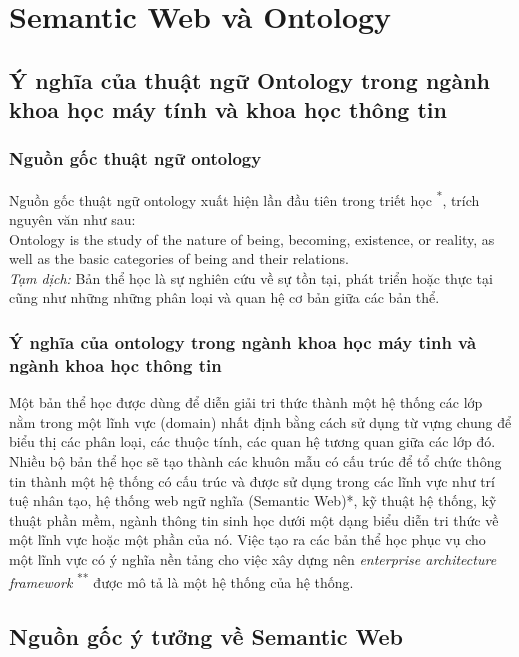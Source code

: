\chapter{Semantic Web và Ontology}
\section{Ý nghĩa của thuật ngữ Ontology trong ngành khoa học máy tính và khoa học thông tin}
\subsection{Nguồn gốc thuật ngữ ontology}
Nguồn gốc thuật ngữ ontology xuất hiện lần đầu tiên trong triết học \textsuperscript{*}, trích nguyên văn như sau:
\\
Ontology is the study of the nature of being, becoming, existence, or reality, as well as the basic categories of being and their relations.
\\
\textit{Tạm dịch:} Bản thể học là sự nghiên cứu về sự tồn tại, phát triển hoặc thực tại cũng như những những phân loại và quan hệ cơ bản giữa các bản thể.
\subsection{Ý nghĩa của ontology trong ngành khoa học máy tinh và ngành khoa học thông tin}
Một bản thể học được dùng để diễn giải tri thức thành một hệ thống các lớp nằm trong một lĩnh vực (domain) nhất định bằng cách sử dụng từ vựng chung để biểu thị các phân loại, các thuộc tính, các quan hệ tương quan giữa các lớp đó.
\\
Nhiều bộ bản thể học sẽ tạo thành các khuôn mẫu có cấu trúc để tổ chức thông tin thành một hệ thống có cấu trúc và được sử dụng trong các lĩnh vực như trí tuệ nhân tạo, hệ thống web ngữ nghĩa (Semantic Web)*, kỹ thuật hệ thống, kỹ thuật phần mềm, ngành thông tin sinh học dưới một dạng biểu diễn tri thức về một lĩnh vực hoặc một phần của nó. Việc tạo ra các bản thể học phục vụ cho một lĩnh vực có ý nghĩa nền tảng cho việc xây dựng nên \textit{enterprise architecture framework} \textsuperscript{**}  được mô tả là một hệ thống của hệ thống.
{\let\thefootnote\relax{}
 \let\thefootnote\relax{}
}
\section{Nguồn gốc ý tưởng về Semantic Web}

